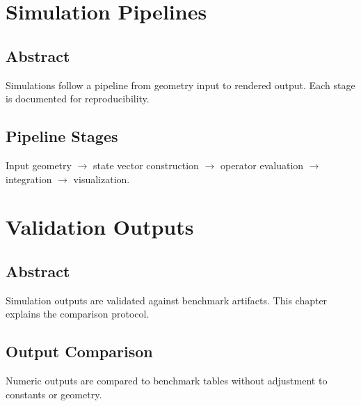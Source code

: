 \documentclass[12pt]{book}
\begin{document}
\chapter{Simulation Pipelines}

\section*{Abstract}
Simulations follow a pipeline from geometry input to rendered output. Each stage is documented for
reproducibility.

\section{Pipeline Stages}
Input geometry $\rightarrow$ state vector construction $\rightarrow$ operator evaluation $\rightarrow$
integration $\rightarrow$ visualization.

\chapter{Validation Outputs}

\section*{Abstract}
Simulation outputs are validated against benchmark artifacts. This chapter explains the comparison
protocol.

\section{Output Comparison}
Numeric outputs are compared to benchmark tables without adjustment to constants or geometry.
\end{document}
